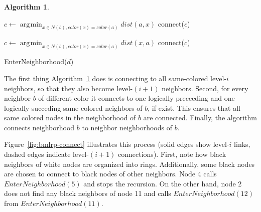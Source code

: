 \documentclass[14pt]{extarticle}
\theoremstyle{definition}
\newtheorem{algo}{Algorithm}
\DeclareMathOperator*{\argmin}{\arg\!\min}
\begin{document}
\begin{algo}
\begin{samepage}
\begin{algorithmic}[1]
                    \State $c \gets \argmin_{x \in N(b), color(x) = color(a)} dist(a,x)$
                        \State connect($c$)     
                    \EndIf

                    \State $c \gets \argmin_{x \in N(b), color(x) = color(a)} dist(x,a)$
                        \State connect($c$)     
                    \EndIf

                        \If {$\argmin_{x \in N(b), color(x) = color(a)} dist(x,a) = a$}
                            \State EnterNeighborhood($d$)   
                        \EndIf
                    \EndFor
                \EndIf
            \EndFor
        \EndFunction
    \end{algorithmic}
    \end{samepage}

    \label{alg:connect}
\end{algo}

The first thing Algorithm~\ref{alg:connect} does is connecting to all same-colored level-$i$ neighbors, so that they also become level-$(i+1)$ neighbors. Second, for every neighbor $b$ of different color it connects to one logically preceeding and one logically succeding same-colored neighbors of $b$, if exist. This ensures that all same colored nodes in the neighborhood of $b$ are connected. Finally, the algorithm connects neighborhood $b$ to neighbor neighborhoods of $b$.

Figure~\ref{fig:bmlrp-connect} illustrates this process (solid edges show level-$i$ links, dashed edges indicate level-$(i+1)$ connections). First, note how black neighbors of white nodes are organized into rings. Additionally, some black nodes are chosen to connect to black nodes of other neighbors. Node 4 calls $EnterNeighborhood(5)$ and stops the recursion. On the other hand, node 2 does not find any black neighbors of node 11 and calls $EnterNeighborhood(12)$ from $EnterNeighborhood(11)$.


\end{document}
